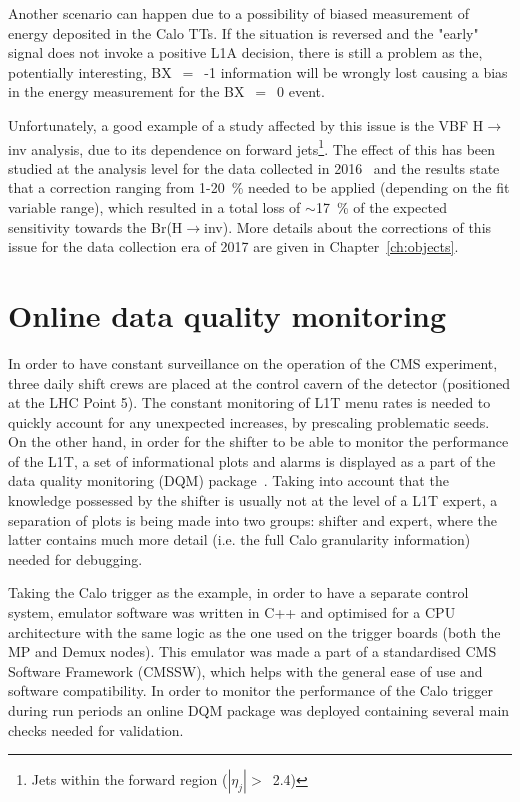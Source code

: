 \hspace{10pt} Another scenario can happen due to a possibility of biased measurement of energy deposited in the Calo TTs. If the situation is reversed and the "early" signal does not invoke a positive L1A decision, there is still a problem as the, potentially interesting, BX~$=$~-1 information will be wrongly lost causing a bias in the energy measurement for the BX~$=$~0 event. 

\hspace{10pt} Unfortunately, a good example of a study affected by this issue is the VBF H$\rightarrow$inv analysis, due to its dependence on forward jets\footnote{Jets within the forward region ($|\eta_j|>$~2.4)}. The effect of this has been studied at the analysis level for the data collected in 2016~\cite{paper:HIG_17_023} and the results state that a correction ranging from 1-20~\% needed to be applied (depending on the fit variable range), which resulted in a total loss of $\sim$17~\% of the expected sensitivity towards the Br(H$\rightarrow$inv). More details about the corrections of this issue for the data collection era of 2017 are given in Chapter~\ref{ch:objects}.


\section{Online data quality monitoring}
\hspace{10pt} In order to have constant surveillance on the operation of the CMS experiment, three daily shift crews are placed at the control cavern of the detector (positioned at the LHC Point 5). The constant monitoring of L1T menu rates is needed to quickly account for any unexpected increases, by prescaling problematic seeds. On the other hand, in order for the shifter to be able to monitor the performance of the L1T, a set of informational plots and alarms is displayed as a part of the data quality monitoring (DQM) package~\cite{Antoni}. Taking into account that the knowledge possessed by the shifter is usually not at the level of a L1T expert, a separation of plots is being made into two groups: shifter and expert, where the latter contains much more detail (i.e. the full Calo granularity information) needed for debugging.

\hspace{10pt} Taking the Calo trigger as the example, in order to have a separate control system, emulator software was written in C++ and optimised for a CPU architecture with the same logic as the one used on the trigger boards (both the MP and Demux nodes). This emulator was made a part of a standardised CMS Software Framework (CMSSW), which helps with the general ease of use and software compatibility. In order to monitor the performance of the Calo trigger during run periods an online DQM package was deployed containing several main checks needed for validation. 

